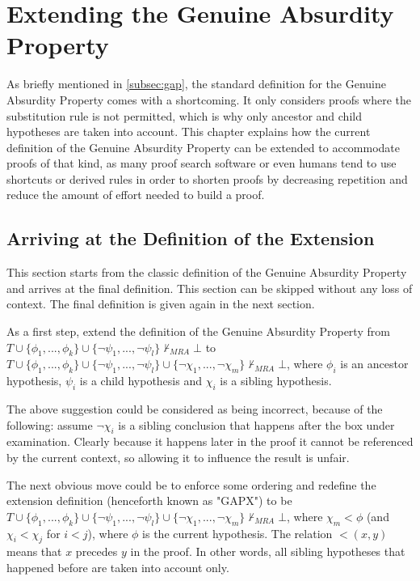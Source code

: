 \documentclass[11pt,twoside,a4paper]{report}
\begin{document}
\chapter{Extending the Genuine Absurdity Property}
\label{chap:gapx}
As briefly mentioned in \autoref{subsec:gap}, the standard definition for the Genuine Absurdity Property comes with a shortcoming. It only considers proofs where the substitution rule is not permitted, which is why only ancestor and child hypotheses are taken into account. This chapter explains how the current definition of the Genuine Absurdity Property can be extended to accommodate proofs of that kind, as many proof search software or even humans tend to use shortcuts or derived rules in order to shorten proofs by decreasing repetition and reduce the amount of effort needed to build a proof.

\section{Arriving at the Definition of the Extension}
This section starts from the classic definition of the Genuine Absurdity Property and arrives at the final definition. This section can be skipped without any loss of context. The final definition is given again in the next section.

As a first step, extend the definition of the Genuine Absurdity Property from $T\cup\{\phi_1, ..., \phi_k\}\cup\{\neg\psi_1, ..., \neg\psi_l\}\nvdash_{MRA}\bot$ to $T\cup\{\phi_1, ..., \phi_k\}\cup\{\neg\psi_1, ..., \neg\psi_l\}\cup\{\neg\chi_1, ..., \neg\chi_m\}\nvdash_{MRA}\bot$, where $\phi_i$ is an ancestor hypothesis, $\psi_i$ is a child hypothesis and $\chi_i$ is a sibling hypothesis.

The above suggestion could be considered as being incorrect, because of the following: assume $\neg\chi_i$ is a sibling conclusion that happens after the box under examination. Clearly because it happens later in the proof it cannot be referenced by the current context, so allowing it to influence the result is unfair.

The next obvious move could be to enforce some ordering and redefine the extension definition (henceforth known as "GAPX") to be $T\cup\{\phi_1, ..., \phi_k\}\cup\{\neg\psi_1, ..., \neg\psi_l\}\cup\{\neg\chi_1, ..., \neg\chi_m\}\nvdash_{MRA}\bot$, where $\chi_m < \phi$ (and $\chi_i < \chi_j$ for $i < j$), where $\phi$ is the current hypothesis. The relation $<(x, y)$ means that $x$ precedes $y$ in the proof. In other words, all sibling hypotheses that happened before are taken into account only.
\end{document}
